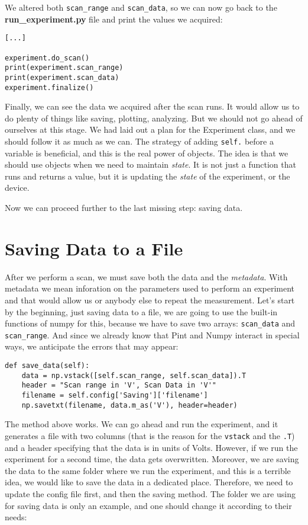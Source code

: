We altered both \texttt{scan\_range} and \texttt{scan\_data}, so we can now go back to the \textbf{run\_experiment.py} file and print the values we acquired:

\begin{verbatim}
[...]

experiment.do_scan()
print(experiment.scan_range)
print(experiment.scan_data)
experiment.finalize()
\end{verbatim}

Finally, we can see the data we acquired after the scan runs. It would allow us to do plenty of things like saving, plotting, analyzing. But we should not go ahead of ourselves at this stage. We had laid out a plan for the Experiment class, and we should follow it as much as we can. The strategy of adding \texttt{self.} before a variable is beneficial, and this is the real power of objects. The idea is that we should use objects when we need to maintain \emph{state}. It is not just a function that runs and returns a value, but it is updating the \emph{state} of the experiment, or the device.

Now we can proceed further to the last missing step: saving data.

\section{Saving Data to a File}\label{section:saving-data}
After we perform a scan, we must save both the data and the \emph{metadata}. With metadata we mean inforation on the parameters used to perform an experiment and that would allow us or anybody else to repeat the measurement. Let's start by the beginning, just saving data to a file, we are going to use the built-in functions of numpy for this, because we have to save two arrays: \texttt{scan\_data} and \texttt{scan\_range}. And since we already know that Pint and Numpy interact in special ways, we anticipate the errors that may appear:

\begin{verbatim}
def save_data(self):
    data = np.vstack([self.scan_range, self.scan_data]).T
    header = "Scan range in 'V', Scan Data in 'V'"
    filename = self.config['Saving']['filename']
    np.savetxt(filename, data.m_as('V'), header=header)
\end{verbatim}

The method above works. We can go ahead and run the experiment, and it generates a file with two columns (that is the reason for the \texttt{vstack} and the \texttt{.T}) and a header specifying that the data is in units of Volts. However, if we run the experiment for a second time, the data gets overwritten. Moreover, we are saving the data to the same folder where we run the experiment, and this is a terrible idea, we would like to save the data in a dedicated place. Therefore, we need to update the config file first, and then the saving method. The folder we are using for saving data is only an example, and one should change it according to their needs:

